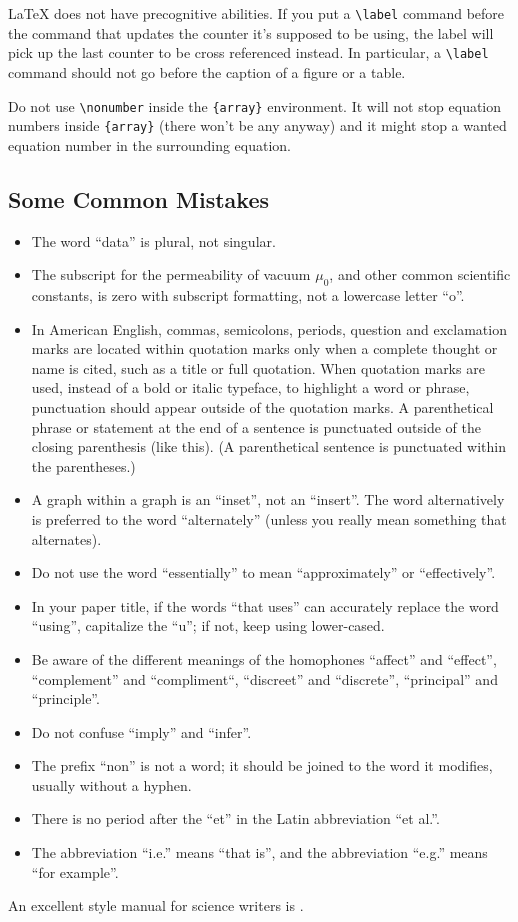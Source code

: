 \documentclass[conference]{IEEEtran}
\begin{document}
{\LaTeX} does not have precognitive abilities. If you put a
\verb|\label| command before the command that updates the counter it's
supposed to be using, the label will pick up the last counter to be
cross referenced instead. In particular, a \verb|\label| command
should not go before the caption of a figure or a table.

Do not use \verb|\nonumber| inside the \verb|{array}| environment. It
will not stop equation numbers inside \verb|{array}| (there won't be
any anyway) and it might stop a wanted equation number in the
surrounding equation.

\subsection{Some Common Mistakes}\label{SCM}
\begin{itemize}
\item The word ``data'' is plural, not singular.
\item The subscript for the permeability of vacuum $\mu_{0}$, and other common scientific constants, is zero with subscript formatting, not a lowercase letter ``o''.
\item In American English, commas, semicolons, periods, question and exclamation marks are located within quotation marks only when a complete thought or name is cited, such as a title or full quotation. When quotation marks are used, instead of a bold or italic typeface, to highlight a word or phrase, punctuation should appear outside of the quotation marks. A parenthetical phrase or statement at the end of a sentence is punctuated outside of the closing parenthesis (like this). (A parenthetical sentence is punctuated within the parentheses.)
\item A graph within a graph is an ``inset'', not an ``insert''. The word alternatively is preferred to the word ``alternately'' (unless you really mean something that alternates).
\item Do not use the word ``essentially'' to mean ``approximately'' or ``effectively''.
\item In your paper title, if the words ``that uses'' can accurately replace the word ``using'', capitalize the ``u''; if not, keep using lower-cased.
\item Be aware of the different meanings of the homophones ``affect'' and ``effect'', ``complement'' and ``compliment``, ``discreet'' and ``discrete'', ``principal'' and ``principle''.
\item Do not confuse ``imply'' and ``infer''.
\item The prefix ``non'' is not a word; it should be joined to the word it modifies, usually without a hyphen.
\item There is no period after the ``et'' in the Latin abbreviation ``et al.''.
\item The abbreviation ``i.e.'' means ``that is'', and the abbreviation ``e.g.'' means ``for example''.
\end{itemize}
An excellent style manual for science writers is \cite{b7}.
\end{document}
